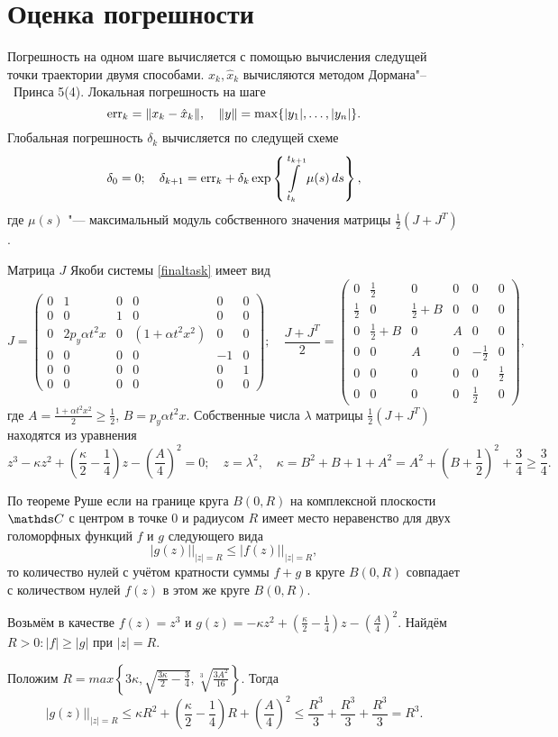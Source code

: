 \section{Оценка погрешности}
Погрешность на одном шаге вычисляется с помощью вычисления следущей точки траектории двумя способами. $x_k,\hat x_k$ вычисляются методом Дормана"--~Принса 5(4). Локальная погрешность на шаге
\[
  \mathrm{err}_{k} = \|x_k-\hat x_k\|,\quad
  \|y\| = \max\{|y_1|,\dots,|y_n|\}.
\]
Глобальная погрешность $\delta_k$ вычисляется по следущей схеме
\[
  \delta_0 = 0;\quad
  \delta_{k+1} = \mathrm{err}_k + \delta_k \exp\left\{ \int\limits_{t_k}^{t_{k+1}} \mu(s)\,ds \right\},
\]
где $\mu(s)$ "--- максимальный модуль собственного значения матрицы $\frac12\left( J+J^T \right)$.

Матрица $J$ Якоби системы \ref{finaltask} имеет вид
\[
  J = \begin{pmatrix}
  0 & 1 & 0 & 0 & 0 & 0\\
  0 & 0 & 1 & 0 & 0 & 0\\
  0 & 2p_y\alpha t^2 x & 0 & (1+ \alpha t^2 x^2) & 0 & 0\\
  0 & 0 & 0 & 0 & -1& 0\\
  0 & 0 & 0 & 0 & 0 & 1\\
  0 & 0 & 0 & 0 & 0 & 0
\end{pmatrix};\quad
  \frac{J+J^T}2 = \begin{pmatrix}
  0 	  & \frac12 	& 0 		& 0 & 0 	& 0	\\
  \frac12 & 0 		& \frac12 + B 	& 0 & 0 	& 0	\\
  0 	  & \frac12 + B & 0 		& A & 0 	& 0	\\
  0 	  & 0 		& A 		& 0 & -\frac12	& 0	\\
  0 	  & 0 		& 0 		& 0 & 0 	&\frac12\\
  0 	  & 0 		& 0 		& 0 & \frac12	&	 0
\end{pmatrix},
\]
где $A = \frac{1+\alpha t^2 x^2}2\ge \frac12$, $B = p_y \alpha t^2 x$. Собственные числа $\lambda$ матрицы $\frac12(J+J^T)$ находятся из уравнения
\[
  z^3 - \kappa z^2 + \left( \frac\kappa2 - \frac14 \right)z - \left( \frac A4 \right)^2 = 0;\quad
  z = \lambda^2,\quad \kappa = B^2 + B + 1 + A^2 = A^2 + \left( B+\frac12 \right)^2 + \frac34\ge\frac34.
\]

По теореме Руше если на границе круга $B(0,R)$ на комплексной плоскости $\C$ с центром в точке $0$ и радиусом $R$ имеет место неравенство для двух голоморфных функций $f$ и $g$ следующего вида
\[
  |g(z)|\big|_{|z| = R}\le |f(z)|\big|_{|z|=R},
\]
то количество нулей с учётом кратности суммы $f+g$ в круге $B(0,R)$ совпадает с количеством нулей $f(z)$ в этом же круге $B(0,R)$.

Возьмём в качестве $f(z) = z^3$ и $g(z) = -\kappa z^2 + \left( \frac\kappa2 - \frac14 \right)z - \left( \frac A4 \right)^2$. Найдём $R>0\colon |f|\ge |g|$ при $|z| = R$.

Положим $R =max\left\{ 3\kappa,\sqrt{\frac{3\kappa}2 - \frac34},\sqrt[3]{\frac{3A^2}{16}} \right\}$. Тогда
\[
  \big|g(z)\big|\bigg|_{|z| = R}\le \kappa R^2 + \left( \frac\kappa2 - \frac14 \right) R + \left( \frac A4 \right)^2\le \frac{R^3}3 + \frac{R^3}3 + \frac{R^3}3 = R^3 .
\]
